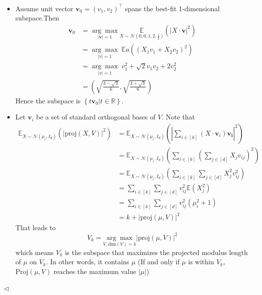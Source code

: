 \documentclass[11pt]{article}
\newenvironment{answer}[1][Answer]{\begin{trivlist}
\item[\hskip \labelsep {\bfseries #1.}\hskip \labelsep]}{\hfill$\lhd$\end{trivlist}}
\begin{document}
\begin{answer}~
\begin{itemize}
    \item [(1)]Assume unit vector $\boldsymbol{v}_0=(v_1,v_2)^\top$ spans the best-fit 1-dimensional subspace.Then
$$\begin{align*}\boldsymbol{v}_0&=\underset{|\boldsymbol{v}|=1}{\arg 
\max} \underset{X \sim\mathcal{N}\left(0,0,1,2,\frac{1}{2}\right)}{\mathbb E}(|X\cdot \boldsymbol{v}|^2)\\&=\underset{|v|=1}{\arg \max} \;{\mathbb Ea}((X_1v_1+X_2v_2)^2)\\&=\underset{|v|=1}{\arg \max}\; v_1^2+\sqrt{2}v_1v_2+2v_2^2\\&=\left(\sqrt{\frac{3-\sqrt{3}}{6}},\sqrt{\frac{3+\sqrt{3}}{6}}\right)\end{align*}$$ 
Hence the subspace is $\left\{t\boldsymbol{v}_0\big|t\in \mathbb R\right\}$.
    \item [(2)]
Let $\boldsymbol{v}_i$ be a set of standard orthogonal bases of $V$. Note that
$$\begin{align*}\mathbb E_{X\sim \mathcal{N}(\mu_i,I_d)}(|\mathrm{proj}(X,V)|^2)&=\mathbb E_{X\sim \mathcal{N}(\mu_i,I_d)}\left(|\sum_{i\in [k]}(X\cdot\boldsymbol{v}_i)\boldsymbol{v_i}|^2\right)\\&=\mathbb E_{X\sim \mathcal{N}(\mu_i,I_d)}\left(\sum_{i\in [k]}\left(\sum_{j\in [d]}X_jv_{ij}\right)^2\right)\\&=\mathbb E_{X\sim \mathcal{N}(\mu_i,I_d)}\left(\sum_{i\in [k]}\sum_{j\in [d]}X_j^2v_{ij}^2\right)\\&=\sum_{i\in [k]}\sum_{j\in [d]}v_{ij}^2\mathbb E(X_j^2)\\&=\sum_{i\in [k]}\sum_{j\in [d]}v_{ij}^2(\mu_i^2+1)\\&=k+|\mathrm{proj}(\mu,V)|^2\end{align*}$$
That leads to
$$V_k=\underset{V,\mathrm{dim}(V)=k}{\arg\max}|\mathrm{proj}(\mu,V)|^2$$
which means $V_k$ is the subspace that maximizes the projected modulus length of $\mu$ on $V_k$. In other words, it contains $\mu$ (If and only if $\mu$ is within $V_k$, $\mathrm{Proj}(\mu,V)$ reaches the maximum value $|\mu|$)
\end{itemize}
    
\end{answer}
\end{document}
